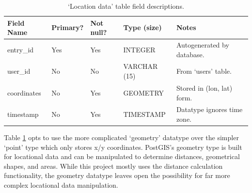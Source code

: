 \begin{table}[!htbp]
    \centering
    \begin{tabular}{lllll}
    \hline
    \textbf{Field Name} & \textbf{Primary?} & \textbf{Not null?} & \textbf{Type (size)} & \textbf{Notes}                          \\ \hline
    entry\_id           & Yes               & Yes                & INTEGER              & Autogenerated by database.              \\ \hline
    user\_id            & No                & No                 & VARCHAR (15)         & From `users' table. \\ \hline
    coordinates         & No                & Yes                & GEOMETRY             & Stored in (lon, lat) form.   \\ \hline
    timestamp           & No                & Yes                & TIMESTAMP            & Datatype ignores time zone.             \\ \hline
    \end{tabular}
    \caption{`Location data' table field descriptions.}
    \label{tab:des_tab2}
\end{table}

Table \ref{tab:des_tab2} opts to use the more complicated `geometry' datatype over the simpler `point' type which only stores x/y coordinates. PostGIS's geometry type is built for locational data and can be manipulated to determine distances, geometrical shapes, and areas. While this project mostly uses the distance calculation functionality, the geometry datatype leaves open the possibility for far more complex locational data manipulation.